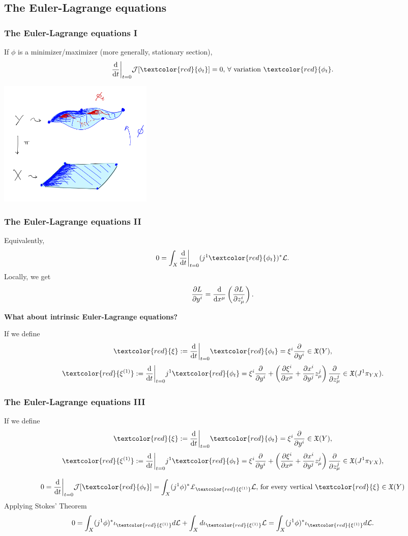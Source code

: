 \subsection{The Euler-Lagrange equations}
\begin{frame}
    \frametitle{The Euler-Lagrange equations I}
    If $\phi$ is a minimizer/maximizer (more generally, \alert{stationary section}), 
    $$\dv{t}\bigg |_{t = 0} \mathcal{J}[\textcolor{red}{\phi_t}] = 0, \, \forall \text{ variation } \textcolor{red}{\phi_t}.$$
    \begin{center}
        \includegraphics[width = 210pt]{Images/Variations.PNG}
    \end{center}
\end{frame}

\begin{frame}
    \frametitle{The Euler-Lagrange equations II}
    Equivalently, $$0 = \int_X \dv{t}\bigg |_{t = 0} (j^1\textcolor{red}{ \phi_t})^\ast \mathcal{L}.$$
    Locally, we get $$\pdv{L}{y^i} = \dv{x^\mu} \left ( \pdv{L}{z^i_\mu} \right ).$$ 
    \begin{center}
        {\large \bf What about \alert{intrinsic} Euler-Lagrange equations?}
    \end{center}
    If we define
    $$\textcolor{red}{\xi} := \dv{t}\bigg |_{t = 0} \textcolor{red}{\phi_t} = \xi^i \pdv{y^i} \in \mathfrak{X}(Y),$$
    $$\textcolor{red}{\xi^{(1)}} := \dv{t}\bigg |_{t = 0} j^1\textcolor{red}{\phi_t} = \xi^i \pdv{y^i} + \left(\pdv{\xi^i}{x^\mu} + \pdv{x^i}{y^j} z^j_\mu \right) \pdv{z^j_\mu}\in \mathfrak{X}(J^1 \pi_{YX}).$$
\end{frame}

\begin{frame}
    \frametitle{The Euler-Lagrange equations III}
    If we define
    $$\textcolor{red}{\xi} := \dv{t}\bigg |_{t = 0} \textcolor{red}{\phi_t} = \xi^i \pdv{y^i} \in \mathfrak{X}(Y),$$
    $$\textcolor{red}{\xi^{(1)}} := \dv{t}\bigg |_{t = 0} j^1\textcolor{red}{\phi_t} = \xi^i \pdv{y^i} + \left(\pdv{\xi^i}{x^\mu} + \pdv{x^i}{y^j}
     z^j_\mu \right) \pdv{z^j_\mu}\in \mathfrak{X}(J^1 \pi_{YX}),$$
    
    $$0 = \dv{t}\bigg |_{t = 0} \mathcal{J}[\textcolor{red}{\phi_t}] = \int_X (j^1 \phi)^\ast \pounds_{ \textcolor{red}{\xi^{(1)}}}
     \mathcal{L}, \, \text{for every vertical } \textcolor{red}{\xi} \in \mathfrak{X}(Y)$$
    Applying Stokes' Theorem
    $$0 = \int_X (j^1 \phi)^\ast  \iota_{ \textcolor{red}{\xi^{(1)}}}
     d \mathcal{L} + \int_X d \iota_{ \textcolor{red}{\xi^{(1)}}}
     \mathcal{L} = \int_X (j^1 \phi)^\ast  \iota_{ \textcolor{red}{\xi^{(1)}}}
     d \mathcal{L}.$$
\end{frame}

